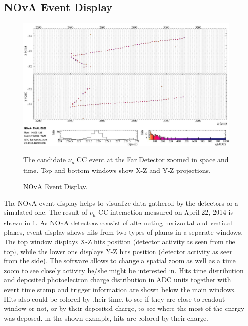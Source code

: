 \subsection{NOvA Event Display}
\begin{figure}
\includegraphics[width=1.0\textwidth]{figures/EventDisp.pdf}\\%
\caption{NOvA Event Display.}
{The candidate $\nu_\mu$ CC event at the Far Detector zoomed in space and time. Top and bottom windows show
X-Z and Y-Z projections.} \label{fig:EVD}
\end{figure}
The NOvA event display helps to visualize data gathered by the detectors or a simulated one. The result
of $\nu_\mu$ CC interaction measured on April 22, 2014 is shown in \ref{fig:EVD}. As NOvA detectors consist of 
alternating horizontal and vertical planes, event display shows hits from two types of planes in a separate 
windows. The top window displays X-Z hits position (detector activity as seen from the top), while the lower 
one displays Y-Z hits position (detector activity as seen from the side). The software allows to change a spatial 
zoom as well as a time zoom to see closely activity he/she might be interested in. Hits time distribution and 
deposited photoelectron charge distribution in ADC units together with event time stamp and trigger information 
are shown below the main windows. Hits also could be colored by their time, to see if they are close to readout 
window or not, or by their deposited charge, to see where the most of the energy was deposed. In the shown 
example, hits are colored by their charge.
